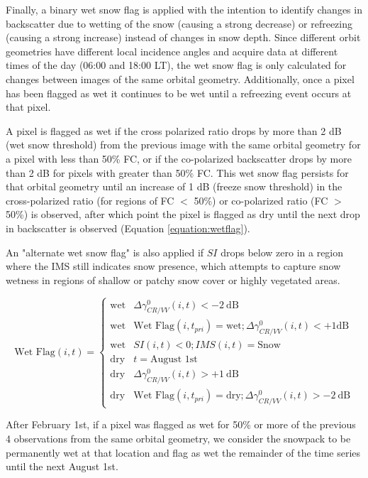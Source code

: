 \documentclass[journal abbreviation, manuscript]{copernicus}
\begin{document}
Finally, a binary wet snow flag is applied with the intention to identify changes in backscatter due to wetting of the snow (causing a strong decrease) or refreezing (causing a strong increase) instead of changes in snow depth. Since different orbit geometries have different local incidence angles and acquire data at different times of the day (06:00 and 18:00 LT), the wet snow flag is only calculated for changes between images of the same orbital geometry. Additionally, once a pixel has been flagged as wet it continues to be wet until a refreezing event occurs at that pixel.

A pixel is flagged as wet if the cross polarized ratio drops by more than 2 dB (wet snow threshold) from the previous image with the same orbital geometry for a pixel with less than 50\% FC, or if the co-polarized backscatter drops by more than 2 dB for pixels with greater than 50\% FC. This wet snow flag persists for that orbital geometry until an increase of 1 dB (freeze snow threshold) in the cross-polarized ratio (for regions of FC $<$ 50\%) or co-polarized ratio (FC $>$ 50\%) is observed, after which point the pixel is flagged as dry until the next drop in backscatter is observed (Equation \ref{equation:wetflag}).

An "alternate wet snow flag" is also applied if $SI$ drops below zero in a region where the IMS still indicates snow presence, which attempts to capture snow wetness in regions of shallow or patchy snow cover or highly vegetated areas.


\begin{equation} \label{equation:wetflag}
    \text{Wet Flag} (i, t) =  \begin{cases} 
      \text{wet} & \Delta \gamma_{CR/VV}^0 (i, t) < - 2~\text{dB} \\
      \text{wet} & \text{Wet Flag}(i, t_{pri}) = \text{wet}; \Delta \gamma_{CR/VV}^0 (i, t) < + 1 \text{dB} \\
      \text{wet} & SI (i, t) < 0; IMS (i, t) = \text{Snow} \\
      \text{dry} & t = \text{August 1st} \\
      \text{dry} & \Delta \gamma_{CR/VV}^0 (i, t) > + 1~\text{dB} \\
      \text{dry} & \text{Wet Flag} (i, t_{pri}) = \text{dry}; \Delta \gamma_{CR/VV}^0 (i, t) > - 2~\text{dB}
   \end{cases}
\end{equation}

After February 1st, if a pixel was flagged as wet for 50\% or more of the previous 4 observations from the same orbital geometry, we consider the snowpack to be permanently wet at that location and flag as wet the remainder of the time series until the next August 1st.
\end{document}
